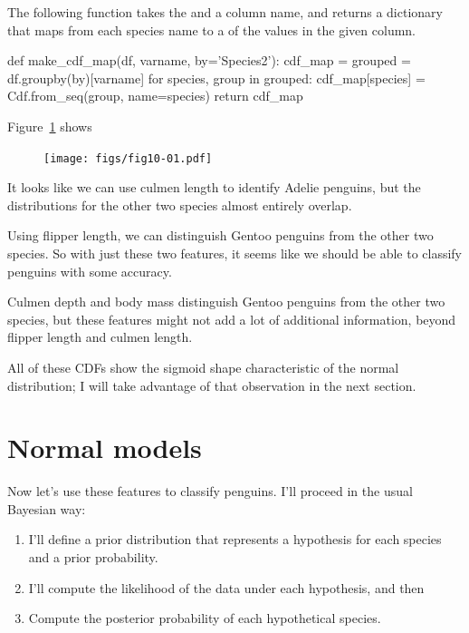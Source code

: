 \documentclass[12pt]{book}
\theoremstyle{exercise}
\begin{document}
The following function takes the  and
a column name, and returns a dictionary that maps from each species name
to a  of the values in the given column.

\begin{code}
def make_cdf_map(df, varname, by='Species2'):
    cdf_map = {}
    grouped = df.groupby(by)[varname]
    for species, group in grouped:
        cdf_map[species] = Cdf.from_seq(group, name=species)
    return cdf_map
\end{code}

Figure~\ref{fig10-01} shows

\begin{figure}
\centerline{\texttt{[image: figs/fig10-01.pdf]}}
\caption{}
\label{fig10-01}
\end{figure}

It looks like we can use culmen length to identify Adelie penguins, but
the distributions for the other two species almost entirely overlap.

Using flipper length, we can distinguish Gentoo penguins from the other
two species. So with just these two features, it seems like we should be
able to classify penguins with some accuracy.

Culmen depth and body mass distinguish Gentoo penguins from the other
two species, but these features might not add a lot of additional
information, beyond flipper length and culmen length.

All of these CDFs show the sigmoid shape characteristic of the normal
distribution; I will take advantage of that observation in the next
section.

\section{Normal models}
\label{normal-models}

Now let's use these features to classify penguins. I'll proceed in the
usual Bayesian way:

\begin{enumerate}

\item
  I'll define a prior distribution that represents a hypothesis for each
  species and a prior probability.
\item
  I'll compute the likelihood of the data under each hypothesis, and
  then
\item
  Compute the posterior probability of each hypothetical species.
\end{enumerate}
\end{document}

